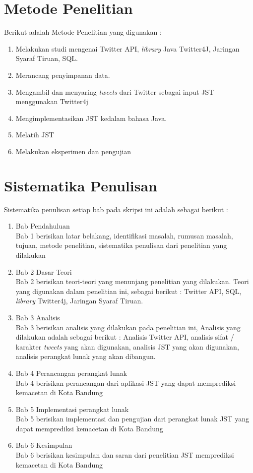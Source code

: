 \section{Metode Penelitian}
Berikut adalah Metode Penelitian yang digunakan :
\begin{enumerate}
	\item Melakukan studi mengenai Twitter API, \textit{library} Java Twitter4J, Jaringan Syaraf Tiruan, SQL.
	\item Merancang penyimpanan data.
	\item Mengambil dan menyaring \textit{tweets} dari Twitter sebagai input JST menggunakan Twitter4j
	\item Mengimplementasikan JST kedalam bahasa Java.
	\item Melatih JST
	\item Melakukan eksperimen dan pengujian
\end{enumerate}
\section{Sistematika Penulisan}
Sistematika penulisan setiap bab pada skripsi ini adalah sebagai berikut :
\begin{enumerate}
	\item Bab Pendahuluan\\
	Bab 1 berisikan latar belakang, identifikasi masalah, rumusan masalah, tujuan, metode penelitian, sistematika penulisan dari penelitian yang dilakukan
	\item Bab 2 Dasar Teori\\ 
	Bab 2 berisikan teori-teori yang menunjang penelitian yang dilakukan. Teori yang digunakan dalam penelitian ini, sebagai berikut : Twitter API, SQL, \textit{library} Twitter4j, Jaringan Syaraf Tiruan.
	\item Bab 3 Analisis\\
	Bab 3 berisikan analisis yang dilakukan pada penelitian ini, Analisis yang dilakukan adalah sebagai berikut : Analisis Twitter API, analisis sifat / karakter \textit{tweets} yang akan digunakan, analisis JST yang akan digunakan, analisis perangkat lunak yang akan dibangun.
	\item Bab 4 Perancangan perangkat lunak\\
	Bab 4 berisikan perancangan dari aplikasi JST yang dapat memprediksi kemacetan di Kota Bandung
	\item Bab 5 Implementasi perangkat lunak\\
	Bab 5 berisikan implementasi dan pengujian dari perangkat lunak JST yang dapat memprediksi kemacetan di Kota Bandung
	\item Bab 6 Kesimpulan\\
	Bab 6 berisikan kesimpulan dan saran dari penelitian JST memprediksi kemacetan di Kota Bandung
\end{enumerate}
